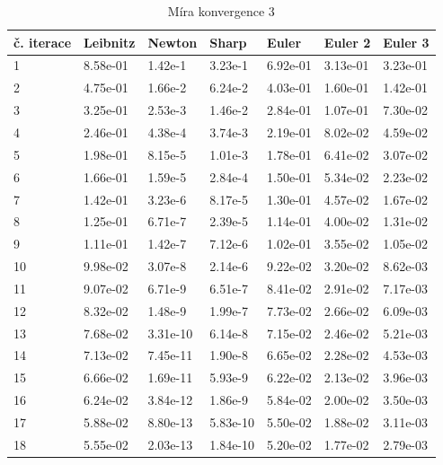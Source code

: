 \documentclass[rocnikovka]{gzwroc} %
\begin{document}
\begin{table}[h!]
\caption{Míra konvergence 3}
\begin{tabular}{|l|l|l|l|l|l|l|}
\hline
\multicolumn{1}{|l|}{\bfseries č. iterace} & \multicolumn{1}{l|}{\bfseries Leibnitz} & \multicolumn{1}{l|}{\bfseries Newton} & \multicolumn{1}{l|}{\bfseries Sharp} & \multicolumn{1}{l|}{\bfseries Euler} & \multicolumn{1}{l|}{\bfseries Euler 2} & \multicolumn{1}{l|}{\bfseries Euler 3}  \\ \hline
1 & 8.58e-01 & 1.42e-1 & 3.23e-1 & 6.92e-01 & 3.13e-01 & 3.23e-01 \\ \hline 
2 & 4.75e-01 & 1.66e-2 & 6.24e-2 & 4.03e-01 & 1.60e-01 & 1.42e-01 \\ \hline 
3 & 3.25e-01 & 2.53e-3 & 1.46e-2 & 2.84e-01 & 1.07e-01 & 7.30e-02 \\ \hline 
4 & 2.46e-01 & 4.38e-4 & 3.74e-3 & 2.19e-01 & 8.02e-02 & 4.59e-02 \\ \hline 
5 & 1.98e-01 & 8.15e-5 & 1.01e-3 & 1.78e-01 & 6.41e-02 & 3.07e-02 \\ \hline 
6 & 1.66e-01 & 1.59e-5 & 2.84e-4 & 1.50e-01 & 5.34e-02 & 2.23e-02 \\ \hline 
7 & 1.42e-01 & 3.23e-6 & 8.17e-5 & 1.30e-01 & 4.57e-02 & 1.67e-02 \\ \hline 
8 & 1.25e-01 & 6.71e-7 & 2.39e-5 & 1.14e-01 & 4.00e-02 & 1.31e-02 \\ \hline 
9 & 1.11e-01 & 1.42e-7 & 7.12e-6 & 1.02e-01 & 3.55e-02 & 1.05e-02 \\ \hline 
10 & 9.98e-02 & 3.07e-8 & 2.14e-6 & 9.22e-02 & 3.20e-02 & 8.62e-03 \\ \hline 
11 & 9.07e-02 & 6.71e-9 & 6.51e-7 & 8.41e-02 & 2.91e-02 & 7.17e-03 \\ \hline 
12 & 8.32e-02 & 1.48e-9 & 1.99e-7 & 7.73e-02 & 2.66e-02 & 6.09e-03 \\ \hline 
13 & 7.68e-02 & 3.31e-10 & 6.14e-8 & 7.15e-02 & 2.46e-02 & 5.21e-03 \\ \hline 
14 & 7.13e-02 & 7.45e-11 & 1.90e-8 & 6.65e-02 & 2.28e-02 & 4.53e-03 \\ \hline 
15 & 6.66e-02 & 1.69e-11 & 5.93e-9 & 6.22e-02 & 2.13e-02 & 3.96e-03 \\ \hline 
16 & 6.24e-02 & 3.84e-12 & 1.86e-9 & 5.84e-02 & 2.00e-02 & 3.50e-03 \\ \hline 
17 & 5.88e-02 & 8.80e-13 & 5.83e-10 & 5.50e-02 & 1.88e-02 & 3.11e-03 \\ \hline 
18 & 5.55e-02 & 2.03e-13 & 1.84e-10 & 5.20e-02 & 1.77e-02 & 2.79e-03 \\ \hline 

\end{tabular}
\end{table}
\end{document}
